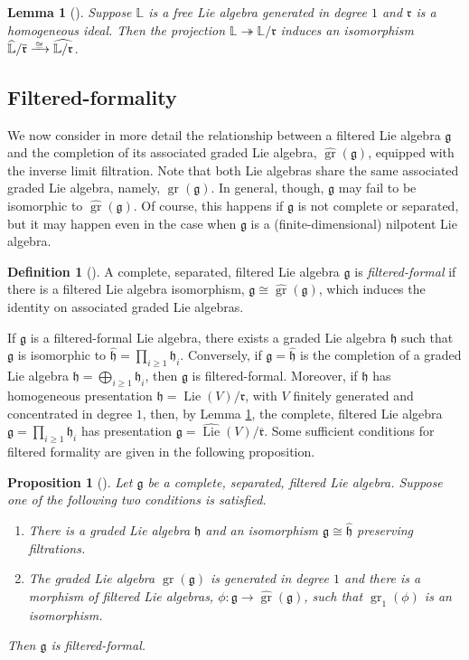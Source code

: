\documentclass{article}
\numberwithin{equation}{section}
\newtheorem{lemma}[theorem]{Lemma}
\newtheorem{proposition}[theorem]{Proposition}
\theoremstyle{definition}
\newtheorem{definition}[theorem]{Definition}
\renewcommand{\L}{\mathbb{L}}
\newcommand{\g}{{\mathfrak{g}}}
\newcommand{\h}{{\mathfrak{h}}}
\newcommand{\fr}{\mathfrak{r}}
\DeclareMathOperator{\gr}{gr}
\DeclareMathOperator{\Lie}{Lie}
\newcommand{\surj}{\twoheadrightarrow}
\newcommand{\isom}{\xrightarrow{
   \,\smash{\raisebox{-0.4ex}{\ensuremath{\scriptstyle\cong}}}\,}}
\begin{document}
\begin{lemma}[\cite{SW-forum}]
\label{lem:presbar}
Suppose $\L$ is a free Lie algebra generated in degree $1$ and 
$\fr$ is a homogeneous ideal. Then the projection $\L\surj \L/\fr$ 
induces an isomorphism 
$\widehat{\L}/\overline{\fr}\isom\widehat{\L/\fr}$.
\end{lemma}

\subsection{Filtered-formality}
\label{subsec:filtered formal}
We now consider in more detail the relationship between a filtered 
Lie algebra $\g$ and the completion of its associated graded Lie 
algebra, $\widehat{\gr}(\g)$, equipped with the inverse limit filtration.  
Note that both Lie algebras share the same associated graded Lie 
algebra, namely, $\gr(\g)$. In general, though, $\g$ may fail to be  
isomorphic to $\widehat{\gr}(\g)$. Of course, this happens  
if $\g$ is not complete or separated, but it may happen 
even in the case when $\g$ is a (finite-dimensional) nilpotent 
Lie algebra.

\begin{definition}[\cite{SW-forum}]
\label{def:filt formal}
A complete, separated, filtered Lie algebra $\g$ is {\em filtered-formal}\/ 
if there is a filtered Lie algebra isomorphism, $\g\cong \widehat{\gr}(\g)$, 
which induces the identity on associated graded Lie algebras.
\end{definition}

If $\g$ is a filtered-formal Lie algebra, there exists a graded 
Lie algebra $\h$ such that $\g$ is isomorphic to 
$\widehat{\h}=\prod_{i\geq 1} \h_i$.
Conversely, if $\g=\widehat{\h}$ is the completion of a 
graded Lie algebra $\h=\bigoplus_{i\ge 1} \h_i$, then $\g$ is filtered-formal. 
Moreover, if $\h$ has homogeneous presentation $\h=\Lie(V)/\mathfrak{r}$, 
with $V$ finitely generated and concentrated in degree $1$, then, 
by Lemma \ref{lem:presbar}, the complete, filtered Lie algebra 
$\g=\prod_{i\ge 1} \h_i$ has presentation 
$\g=\widehat{\Lie}(V)/\overline{\mathfrak{r}}$. 
Some sufficient conditions for filtered formality 
are given in the following proposition.

\begin{proposition}[\cite{SW-forum}]
\label{lem:filtiso}
Let $\g$ be a complete, separated, filtered Lie algebra. Suppose 
one of the following two conditions is satisfied.
\begin{enumerate}
\item \label{filt1}
There is a graded Lie algebra $\h$ and an isomorphism 
$\g\cong \widehat{\h}$ preserving filtrations.
\item \label{filt2}
The  graded Lie algebra $\gr(\g)$ is generated in degree $1$ 
and there is a morphism of filtered Lie algebras,  
$\phi\colon \g \to \widehat{\gr}(\g)$, such that $\gr_1(\phi)$ is an 
isomorphism. 
\end{enumerate}
Then $\g$ is filtered-formal.
\end{proposition} 
\end{document}
